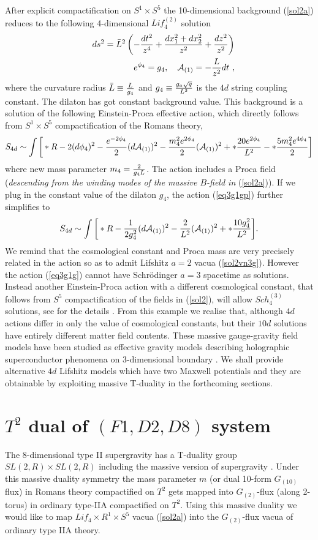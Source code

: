 \documentclass[12pt]{article}
\def\bea{\begin{eqnarray}} \def\eea{\end{eqnarray}} \def\ba{\begin{array}}
\newcommand{\eqn}[1]{(\ref{#1})}
\def\br{\nonumber\\}
\begin{document}
After explicit
 compactification on $S^1\times S^5$ the 10-dimensional background  \eqn{sol2a}
reduces to the following 4-dimensional 
$Lif_4^{(2)}$ solution  
\bea\label{sol2vn3g}
&&ds^2=\bar{L}^2\left(- {dt^2\over  z^4} +{dx_1^2+dx_2^2 \over z^2}+{dz^2\over
z^2} \right)    \br
&& e^{\phi_4}=g_4, ~~~{\cal{A}}_{(1)}= - {{L}\over  z^2}dt  \ ,
\eea
where the  curvature radius $\bar{L}\equiv{L\over {g}_4}$ and
${g}_4\equiv {g_a\sqrt{q}\over L^3}$ is 
 the  $4d$ string coupling constant. 
The dilaton has got  constant background value. 
This background is a solution of the following Einstein-Proca effective
action, which 
directly follows from  $S^1\times S^5$
compactification of  the  Romans theory, 
\bea\label{eq3g1gp}
S_{4d}\sim \int \bigg[ \ast R -2 (d\phi_4)^2 
-{ e^{-2\phi_4}\over 2}(d{\cal{A}}_{(1)})^2 
- { m_4^2e^{2\phi_4}\over 2}({\cal{A}}_{(1)})^2 
+\ast{20e^{2\phi_4}\over L^2} 
  -\ast{5m_4^2 e^{4\phi_4}\over 2}    
\bigg]
\eea
where new mass parameter $m_4={2\over g_4 L}$.
The  action includes a Proca  field ({\it descending from the winding modes 
of the massive $B$-field in} \eqn{sol2a}). If we plug in the constant
value of the dilaton $g_4$, the action \eqn{eq3g1gp} further simplifies to
\bea\label{eq3g1g}
S_{4d}\sim \int \bigg[ \ast R 
-{ 1\over 2 g_4^2}(d{\cal{A}}_{(1)})^2 
- { 2\over L^2}({\cal{A}}_{(1)})^2 
+\ast {10 g_4^2\over L^2}   
\bigg].
\eea
We remind that the cosmological constant and Proca mass are very precisely
related in the action so as to admit Lifshitz $a=2$ vacua \eqn{sol2vn3g}. 
However the  action \eqn{eq3g1g}  cannot have  Schr\"odinger $a=3$ spacetime
  as  solutions.
Instead another Einstein-Proca action with a different cosmological constant, 
that follows from $S^5$ compactification of the fields in \eqn{sol2}, 
will allow $Sch_4^{(3)}$ solutions, 
see for the details \cite{Singh:2009tq,singh0866}. From this example
 we realise that, although $4d$ actions differ in only
the value of cosmological constants, but their
 $10d$ solutions have entirely different matter field contents.
These massive gauge-gravity  field models have been studied as 
effective  gravity models describing  holographic superconductor  
phenomena on  3-dimensional boundary  
\cite{bala,son,Hartnoll:2008kx}. We shall
provide  alternative $4d$ Lifshitz models which have two Maxwell potentials
and they are obtainable by exploiting massive T-duality
in the forthcoming sections.

\section{ $T^2$ dual of $(F1,D2,D8)$ system }
The 8-dimensional  type II supergravity 
 has a T-duality group $SL(2,R)\times SL(2,R)$ including the
massive version of supergravity \cite{hs2001}.
Under this massive duality symmetry the mass parameter $m$ 
(or dual 10-form $G_{(10)}$ flux) in 
Romans theory compactified on $T^2$ gets mapped into
$G_{(2)}$-flux (along 2-torus) in ordinary type-IIA compactified on $T^2$. 
Using this massive  duality we would like to map
 $Lif_4 \times R^1\times S^5$  vacua \eqn{sol2a} into the $G_{(2)}$-flux
vacua of ordinary type IIA theory. 
\end{document}
